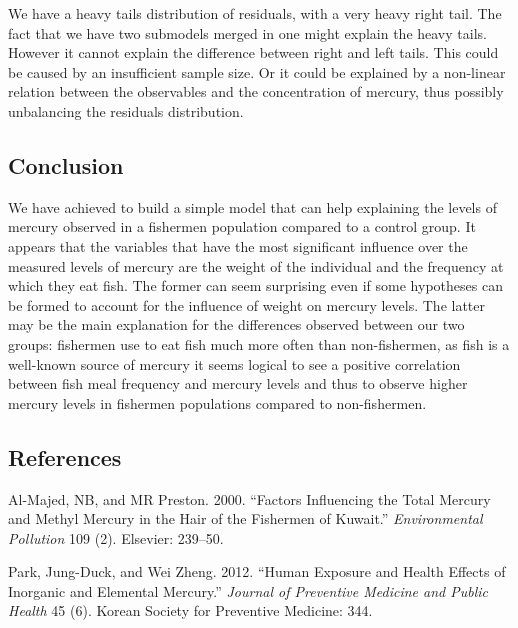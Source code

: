 \documentclass[12pt,]{article}
\begin{document}
We have a heavy tails distribution of residuals, with a very heavy right
tail. The fact that we have two submodels merged in one might explain
the heavy tails. However it cannot explain the difference between right
and left tails. This could be caused by an insufficient sample size. Or
it could be explained by a non-linear relation between the observables
and the concentration of mercury, thus possibly unbalancing the
residuals distribution.

\subsection{Conclusion}\label{conclusion}

We have achieved to build a simple model that can help explaining the
levels of mercury observed in a fishermen population compared to a
control group. It appears that the variables that have the most
significant influence over the measured levels of mercury are the weight
of the individual and the frequency at which they eat fish. The former
can seem surprising even if some hypotheses can be formed to account for
the influence of weight on mercury levels. The latter may be the main
explanation for the differences observed between our two groups:
fishermen use to eat fish much more often than non-fishermen, as fish is
a well-known source of mercury it seems logical to see a positive
correlation between fish meal frequency and mercury levels and thus to
observe higher mercury levels in fishermen populations compared to
non-fishermen.

\subsection*{References}\label{references}

\hypertarget{refs}{}
\hypertarget{ref-al2000factors}{}
Al-Majed, NB, and MR Preston. 2000. ``Factors Influencing the Total
Mercury and Methyl Mercury in the Hair of the Fishermen of Kuwait.''
\emph{Environmental Pollution} 109 (2). Elsevier: 239--50.

\hypertarget{ref-park2012human}{}
Park, Jung-Duck, and Wei Zheng. 2012. ``Human Exposure and Health
Effects of Inorganic and Elemental Mercury.'' \emph{Journal of
Preventive Medicine and Public Health} 45 (6). Korean Society for
Preventive Medicine: 344.
\end{document}
